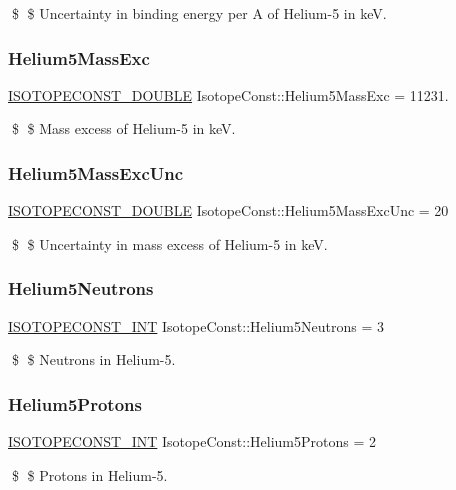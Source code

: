 \$ \$ Uncertainty in binding energy per A of Helium-\/5 in keV. \mbox{\label{group___isotope_const-_helium-_he5_gaa9054e7a2402082e151e008ce60fc99f}} 
\subsubsection{\texorpdfstring{Helium5\+Mass\+Exc}{Helium5MassExc}}
{\footnotesize\ttfamily \mbox{\hyperlink{group___isotope_const-_macros_ga8f45a7272ce02c0b4c65c44636ed719a}{I\+S\+O\+T\+O\+P\+E\+C\+O\+N\+S\+T\+\_\+\+D\+O\+U\+B\+LE}} Isotope\+Const\+::\+Helium5\+Mass\+Exc = 11231.}

\$ \$ Mass excess of Helium-\/5 in keV. \mbox{\label{group___isotope_const-_helium-_he5_ga193351c7745763483c461fb7dc13897e}} 
\subsubsection{\texorpdfstring{Helium5\+Mass\+Exc\+Unc}{Helium5MassExcUnc}}
{\footnotesize\ttfamily \mbox{\hyperlink{group___isotope_const-_macros_ga8f45a7272ce02c0b4c65c44636ed719a}{I\+S\+O\+T\+O\+P\+E\+C\+O\+N\+S\+T\+\_\+\+D\+O\+U\+B\+LE}} Isotope\+Const\+::\+Helium5\+Mass\+Exc\+Unc = 20}

\$ \$ Uncertainty in mass excess of Helium-\/5 in keV. \mbox{\label{group___isotope_const-_helium-_he5_ga8d4e36bd432b0190fb4ec7d0cc839f7c}} 
\subsubsection{\texorpdfstring{Helium5\+Neutrons}{Helium5Neutrons}}
{\footnotesize\ttfamily \mbox{\hyperlink{group___isotope_const-_macros_ga5f18360b3e99483a35c32d789e62621c}{I\+S\+O\+T\+O\+P\+E\+C\+O\+N\+S\+T\+\_\+\+I\+NT}} Isotope\+Const\+::\+Helium5\+Neutrons = 3}

\$ \$ Neutrons in Helium-\/5. \mbox{\label{group___isotope_const-_helium-_he5_gab5fb4e5da8363a0b9d59db72d2891bce}} 
\subsubsection{\texorpdfstring{Helium5\+Protons}{Helium5Protons}}
{\footnotesize\ttfamily \mbox{\hyperlink{group___isotope_const-_macros_ga5f18360b3e99483a35c32d789e62621c}{I\+S\+O\+T\+O\+P\+E\+C\+O\+N\+S\+T\+\_\+\+I\+NT}} Isotope\+Const\+::\+Helium5\+Protons = 2}

\$ \$ Protons in Helium-\/5. 